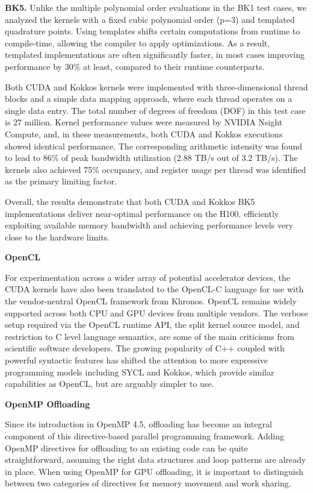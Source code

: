 \documentclass[a4paper,12pt, numbers]{article}
\begin{document}
{\bf BK5.} Unlike the multiple polynomial order evaluations in the BK1 test cases, we analyzed the kernels with a fixed cubic polynomial order (p=3) and templated quadrature points. Using templates shifts certain computations from runtime to compile-time, allowing the compiler to apply optimizations. As a result, templated implementations are often significantly faster, in most cases improving performance by 30\% at least, compared to their runtime counterparts.

Both CUDA and Kokkos kernels were implemented with three-dimensional thread blocks and a simple data mapping approach, where each thread operates on a single data entry. The total number of degrees of freedom (DOF) in this test case is 27 million. Kernel performance values were measured by NVIDIA Nsight Compute, and, in these measurements, both CUDA and Kokkos executions showed identical performance. The corresponding arithmetic intensity was found to lead to 86\% of peak bandwidth utilization (2.88 TB/s out of 3.2 TB/s). The kernels also achieved 75\% occupancy, and register usage per thread was identified as the primary limiting factor.

Overall, the results demonstrate that both CUDA and Kokkos BK5 implementations deliver near-optimal performance on the H100, efficiently exploiting available memory bandwidth and achieving performance levels very close to the hardware limits.

\noindent\textbf{OpenCL}

For experimentation across a wider array of potential accelerator devices, the CUDA kernels have also been translated to the OpenCL-C language for use with the vendor-neutral OpenCL framework from Khronos. OpenCL remains widely supported across both CPU and GPU devices from multiple vendors. The verbose setup required via the OpenCL runtime API, the split kernel source model, and restriction to C level language semantics, are some of the main criticisms from scientific software developers.  The growing popularity of C++ coupled with powerful syntactic features has shifted the attention to more expressive programming models including SYCL and Kokkos, which provide similar capabilities as OpenCL, but are arguably simpler to use. 

\noindent\textbf{OpenMP Offloading}

Since its introduction in OpenMP 4.5, offloading has become an integral component of this directive-based parallel programming framework. Adding OpenMP directives for offloading to an existing code can be quite straightforward, assuming the right data structures and loop patterns are already in place. When using OpenMP for GPU offloading, it is important to distinguish between two categories of directives for memory movement and work sharing.
\end{document}
